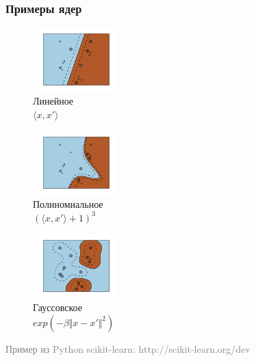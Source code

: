 \documentclass[12pt]{beamer}
\begin{document}
\begin{frame}\frametitle{Примеры ядер}
\begin{figure}[htbp]
	\begin{minipage}{.3\textwidth}
	  \includegraphics[height=70pt, keepaspectratio = true]{images/linear} \\
	  \centering Линейное\\$\langle x, x'\rangle$
    \end{minipage}%
    \begin{minipage}{.3\textwidth}
		\includegraphics[height=70pt, keepaspectratio = true]{images/poly}   \\
		\centering Полиномиальное\\$(\langle x, x'\rangle + 1)^3$
	\end{minipage}%
    \begin{minipage}{.3\textwidth}
		\includegraphics[height=70pt, keepaspectratio = true]{images/gauss}   \\
		\centering Гауссовское\\$exp(-\beta \Vert x - x'\Vert^2 )$
	\end{minipage}%

\end{figure}
\vspace{10mm}
\textcolor{gray}{Пример из Python scikit-learn: http://scikit-learn.org/dev}

\end{frame}
\end{document}
